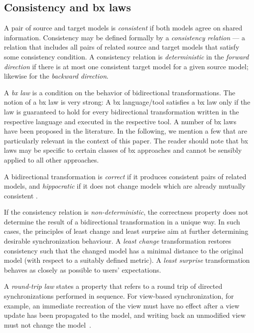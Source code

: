 \subsection{Consistency and bx laws}
\label{sec:Consistency}

A pair of source and target models is \emph{consistent} if both models agree on shared information. 
Consistency may be defined formally by a \emph{consistency relation} --- a relation that includes all pairs of related source and target models that satisfy some consistency condition. 
A consistency relation is \emph{deterministic} in the \emph{forward direction} if there is at most one consistent target model for a given source model; likewise for the \emph{backward direction}. 

A \emph{bx law} is a condition on the behavior of bidirectional transformations. 
The notion of a bx law is very strong: A bx language/tool satisfies a bx law only if the law is guaranteed to hold for every bidirectional transformation written in the respective language and executed in the respective tool. 
A number of bx laws have been proposed in the literature. 
In the following, we mention a few that are particularly relevant in the context of this paper. 
The reader should note that bx laws may be specific to certain classes of bx approaches and cannot be sensibly applied to all other approaches.

A bidirectional transformation is \emph{correct} if it produces consistent pairs of related models, and \emph{hippocratic} if it does not change models which are already mutually consistent \cite{SOSYM-Stevens2010}.
 
If the consistency relation is \emph{non-deter\-min\-is\-tic}, the correctness property does not determine the result of a bidirectional transformation in a unique way. 
In such cases, the principles of least change and least surprise aim at further determining desirable synchronization behaviour. 
A \emph{least change} transformation \cite{SOSYM-Macedo2016} restores consistency such that the changed model has a minimal distance to the original model (with respect to a suitably defined metric). 
A \emph{least surprise} transformation \cite{Cheney2015} behaves as closely as possible to users' expectations.

A \emph{round-trip law} states a property that refers to a round trip of directed synchronizations performed in sequence. 
For view-based synchronization, for example, an immediate recreation of the view must have no effect after a view update has been propagated to the model, and writing back an unmodified view must not change the model~\cite{TOPLAS2007-Foster}.


